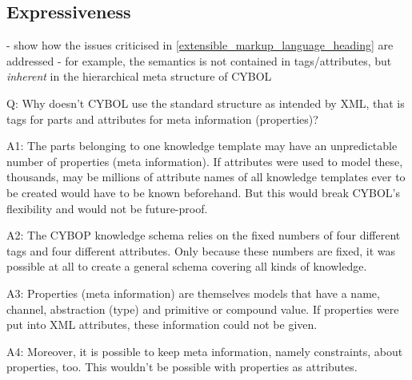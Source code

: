 %
%
%
%
%
%
%

\subsection{Expressiveness}
\label{expressiveness_heading}

- show how the issues criticised in \ref{extensible_markup_language_heading} are addressed
- for example, the semantics is not contained in tags/attributes, but \emph{inherent}
in the hierarchical meta structure of CYBOL

Q: Why doesn't CYBOL use the standard structure as intended by XML,
that is tags for parts and attributes for meta information (properties)?

A1: The parts belonging to one knowledge template may have an unpredictable
number of properties (meta information). If attributes were used to model
these, thousands, may be millions of attribute names of all knowledge templates
ever to be created would have to be known beforehand. But this would break
CYBOL's flexibility and would not be future-proof.

A2: The CYBOP knowledge schema relies on the fixed numbers of four different
tags and four different attributes. Only because these numbers are fixed, it
was possible at all to create a general schema covering all kinds of knowledge.

A3: Properties (meta information) are themselves models that have a name,
channel, abstraction (type) and primitive or compound value. If properties were
put into XML attributes, these information could not be given.

A4: Moreover, it is possible to keep meta information, namely constraints,
about properties, too. This wouldn't be possible with properties as attributes.

